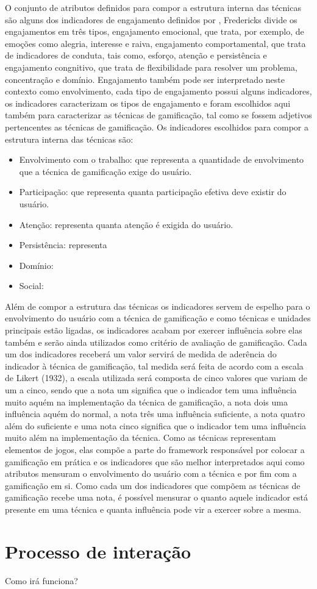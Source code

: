 O conjunto de atributos definidos para compor a estrutura interna das técnicas são alguns dos indicadores de engajamento definidos por \cite{arruda200}, Fredericks divide os engajamentos em três tipos, engajamento emocional, que trata, por exemplo, de emoções como alegria, interesse e raiva, engajamento comportamental, que trata de indicadores de conduta, tais como, esforço, atenção e persistência e engajamento congnitivo, que trata de flexibilidade para resolver um problema, concentração e domínio. Engajamento também pode ser interpretado neste contexto como envolvimento, cada tipo de engajamento possui alguns indicadores, os indicadores caracterizam os tipos de engajamento e foram escolhidos aqui também para caracterizar as técnicas de gamificação, tal como se fossem adjetivos pertencentes as técnicas de gamificação. Os indicadores escolhidos para compor a estrutura interna das técnicas são: 

\begin{itemize}

\item Envolvimento com o trabalho: que representa a quantidade de envolvimento que a técnica de gamificação exige do usuário.
\item Participação: que representa quanta participação efetiva deve existir do usuário.
\item Atenção: representa quanta atenção é exigida do usuário.
\item Persistência: representa 
\item Domínio:
\item Social:

\end{itemize}

 Além de compor a estrutura das técnicas os indicadores servem de espelho para o envolvimento do usuário com a técnica de gamificação e como técnicas e unidades principais estão ligadas, os indicadores acabam por exercer influência sobre elas também e serão ainda utilizados como critério de avaliação de gamificação. Cada um dos indicadores receberá um valor servirá de medida de aderência do indicador à técnica de gamificação, tal medida será feita de acordo com a escala de Likert (1932), a escala utilizada será composta de cinco valores que variam de um a cinco, sendo que a nota um significa que o indicador tem uma influência muito aquém na implementação da técnica de gamificação, a nota dois uma influência aquém do normal, a nota três uma influência suficiente, a nota quatro além do suficiente e uma nota cinco significa que o indicador tem uma influência muito além na implementação da técnica.  Como as técnicas representam elementos de jogos, elas compõe a parte do framework responsável por colocar a gamificação em prática e os indicadores que são melhor interpretados aqui como atributos mensuram o envolvimento do usuário com a técnica e por fim com a gamificação em si. Como cada um dos indicadores que compõem as técnicas de gamificação recebe uma nota, é possível mensurar o quanto aquele indicador está presente em uma técnica e quanta influência pode vir a  exercer sobre a mesma.


\section{Processo de interação}

Como irá funciona?

